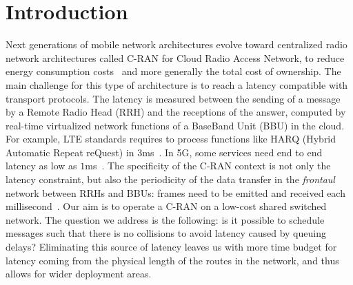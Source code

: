 \documentclass[10pt, conference, letterpaper]{IEEEtran}
\begin{document}
\section{Introduction}

Next generations of mobile network architectures evolve toward centralized radio network architectures called C-RAN for Cloud Radio Access Network, to reduce energy consumption costs~\cite{mobile2011c} and more generally the total cost of ownership. The main challenge for this type of architecture is to reach a latency compatible with transport protocols. The latency is measured between the sending of a message by a Remote Radio Head (RRH) and the receptions of the answer, computed by real-time virtualized network functions of a BaseBand Unit (BBU) in the cloud. For example, LTE standards requires to process functions like HARQ (Hybrid Automatic Repeat reQuest) in $3$ms~\cite{bouguen2012lte}. In 5G, some services need end to end latency as low as $1$ms~\cite{3gpp5g}. The specificity of the C-RAN context is not only the latency constraint, but also the periodicity of the data transfer in the \emph{frontaul} network between RRHs and BBUs: frames need to be emitted and received each millisecond~\cite{bouguen2012lte}.
Our aim is to operate a C-RAN on a low-cost shared switched network.
The question we address is the following: is it possible to schedule messages such that there is no collisions to avoid latency caused by queuing delays? 
Eliminating this source of latency leaves us with more time budget for latency coming from the physical length of the routes in the network, and thus allows for wider deployment areas.
\end{document}
